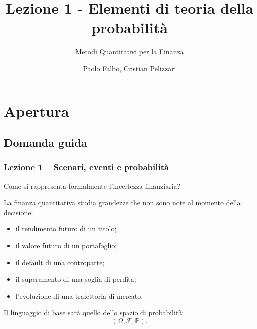 \documentclass[handout]{beamer}%
\title{Lezione 1 - Elementi di teoria della probabilit\`{a}}
\subtitle{Metodi Quantitativi per la Finanza}
\author[P. Falbo, C. Pelizzari]{{\LARGE Paolo Falbo, Cristian Pelizzari}}
\institute[]{{\large Dipartimento Economia e Management}}
\date[]{}
\newenvironment{stepitemize}{\begin{itemize}[<+->]}{\end{itemize} }
\providecommand{\Prob}{\mathbb{P}}
\providecommand{\F}{\mathcal{F}}
\providecommand{\QTR}[2]{\csname #1\endcsname{#2}}
\begin{document}
\maketitle
\section{Apertura}


\subsection{Domanda guida}%

\begin{frame}%
%

\frametitle{Lezione 1 -- Scenari, eventi e probabilit\`{a}}%
%

%


\begin{center}
{\Large Come si rappresenta formalmente l'incertezza finanziaria?}
\end{center}

\medskip

La finanza quantitativa studia grandezze che non sono note al momento della decisione:

\begin{stepitemize}
\item il rendimento futuro di un titolo;

\item il valore futuro di un portafoglio;

\item il default di una controparte;

\item il superamento di una soglia di perdita;

\item l'evoluzione di una traiettoria di mercato.
\end{stepitemize}

\medskip

Il linguaggio di base sar\`{a} quello dello spazio di probabilit\`{a}:
\[
(\Omega,\F,\Prob).
\]
%

\transboxout
\end{frame}%
\end{document}
